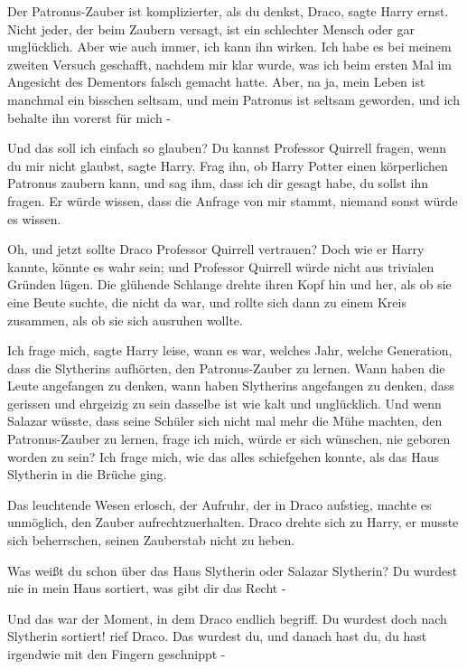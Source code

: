 \glqq Der Patronus-Zauber ist komplizierter, als du denkst, Draco\grqq{}, sagte
Harry ernst. \glqq Nicht jeder, der beim Zaubern versagt, ist ein schlechter
Mensch oder gar unglücklich. Aber wie auch immer, ich kann ihn wirken. Ich habe
es bei meinem zweiten Versuch geschafft, nachdem mir klar wurde, was ich beim
ersten Mal im Angesicht des Dementors falsch gemacht hatte. Aber, na ja, mein
Leben ist manchmal ein bisschen seltsam, und mein Patronus ist seltsam geworden,
und ich behalte ihn vorerst für mich -\grqq{}

\glqq Und das soll ich einfach so glauben?\grqq{} \glqq Du kannst Professor
Quirrell fragen, wenn du mir nicht glaubst\grqq{}, sagte Harry. \glqq Frag ihn,
ob Harry Potter einen körperlichen Patronus zaubern kann, und sag ihm, dass ich
dir gesagt habe, du sollst ihn fragen. Er würde wissen, dass die Anfrage von mir
stammt, niemand sonst würde es wissen.\grqq{}

Oh, und jetzt sollte Draco Professor Quirrell vertrauen? Doch wie er Harry
kannte, könnte es wahr sein; und Professor Quirrell würde nicht aus trivialen
Gründen lügen. Die glühende Schlange drehte ihren Kopf hin und her, als ob sie
eine Beute suchte, die nicht da war, und rollte sich dann zu einem Kreis
zusammen, als ob sie sich ausruhen wollte.

\glqq Ich frage mich\grqq{}, sagte Harry leise, \glqq wann es war, welches Jahr,
welche Generation, dass die Slytherins aufhörten, den Patronus-Zauber zu lernen.
Wann haben die Leute angefangen zu denken, wann haben Slytherins angefangen zu
denken, dass gerissen und ehrgeizig zu sein dasselbe ist wie kalt und
unglücklich. Und wenn Salazar wüsste, dass seine Schüler sich nicht mal mehr die
Mühe machten, den Patronus-Zauber zu lernen, frage ich mich, würde er sich
wünschen, nie geboren worden zu sein? Ich frage mich, wie das alles schiefgehen
konnte, als das Haus Slytherin in die Brüche ging.\grqq{}

Das leuchtende Wesen erlosch, der Aufruhr, der in Draco aufstieg, machte es
unmöglich, den Zauber aufrechtzuerhalten. Draco drehte sich zu Harry, er musste
sich beherrschen, seinen Zauberstab nicht zu heben.

\glqq Was weißt du schon über das Haus Slytherin oder Salazar Slytherin? Du
wurdest nie in mein Haus sortiert, was gibt dir das Recht -\grqq{}

Und das war der Moment, in dem Draco endlich begriff. \glqq Du wurdest doch nach
Slytherin sortiert!\grqq{} rief Draco. \glqq Das wurdest du, und danach hast du,
du hast irgendwie mit den Fingern geschnippt -\grqq{}

